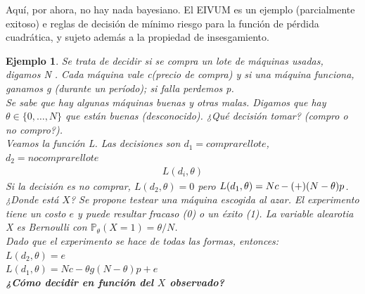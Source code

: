\documentclass[10pt]{article}
\theoremstyle{plain}
\newtheorem{ej}{Ejemplo}
\theoremstyle{definition}
\begin{document}
Aquí, por ahora, no hay nada bayesiano. El EIVUM es un ejemplo (parcialmente exitoso) e reglas de decisión de mínimo riesgo para la función de pérdida cuadrática, y sujeto además a la propiedad de insesgamiento.

\begin{ej} Se trata de decidir si se compra un lote de máquinas usadas, digamos N . Cada máquina vale c(precio de compra) y si una máquina funciona, ganamos g (durante un período); si falla perdemos p.\\
Se sabe que hay algunas máquinas buenas y otras malas. Digamos que hay $\theta \in \{0,\ldots,N\}$ que están buenas (desconocido). ¿Qué decisión tomar? (compro o no compro?).\\
Veamos la función L. Las decisiones son $d_{1} = comprar el lote$, $d_{2} = no comprar el lote$
\begin{align*}
L(d_{i},\theta) 
\end{align*}
Si la decisión es no comprar, $L(d_{2},\theta) = 0$ pero $L(d_{1},\theta) = Nc - \thetag + (N-\theta)p$.\\

¿Donde está $X$? Se propone testear una máquina escogida al azar. El experimento tiene un costo $e$ y puede resultar fracaso (0) o un éxito (1). La variable alearotia  X es Bernoulli con $\mathbb{P}_{\theta}(X=1) = \theta/N$.\\

Dado que el experimento se hace de todas las formas, entonces:\\
$L(d_{2},\theta) = e$\\
$L(d_{1},\theta) = Nc-\theta g (N-\theta)p + e$\\

\textbf{¿Cómo decidir en función del $X$ observado?}\\


\end{ej}
\end{document}
